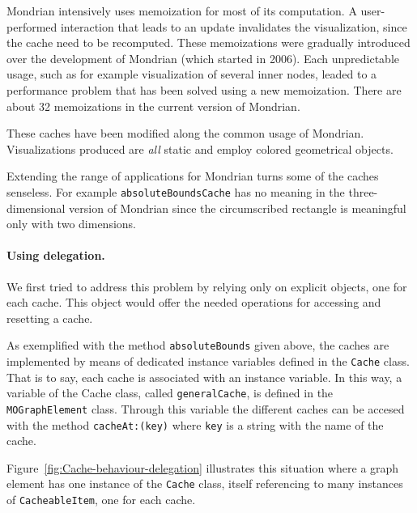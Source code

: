 \documentclass[preprint,10pt]{sigplanconf}
\newcommand{\ct}{\lstinline[backgroundcolor=\color{white},basicstyle=\footnotesize\ttfamily]}
\newcommand{\ab}[1]{\nb{Alexandre}{blue}{#1}}
\newcommand{\sv}[1]{\nb{Santiago}{orange}{#1}}
\newcommand{\figref}[1]{Figure~\ref{fig:#1}\xspace}
\begin{document}
Mondrian intensively uses memoization for most of its computation. A user-performed interaction that leads to an update invalidates the visualization, since the cache need to be recomputed. These memoizations were gradually introduced over the development of Mondrian (which started in 2006). Each unpredictable usage, such as for example visualization of several inner nodes, leaded to a performance problem that has been solved using a new memoization. There are about 32 memoizations in the current version of Mondrian.

These caches have been modified along the common usage of Mondrian. Visualizations produced are \emph{all} static and employ colored geometrical objects.

Extending the range of applications for Mondrian turns some of the caches senseless. For example \ct{absoluteBoundsCache} has no meaning in the three-dimensional version of Mondrian since the circumscribed rectangle is meaningful only with two dimensions.

\paragraph{Using delegation.}
We first tried to address this problem by relying only on explicit objects, one for each cache. This object would offer the needed operations for accessing and resetting a cache.

As exemplified with the method \ct{absoluteBounds} given above, the caches are implemented by means of dedicated instance variables defined in the \ct{Cache} class. That is to say, each cache is associated with an instance variable. In this way, a variable of the Cache class, called \ct{generalCache}, is defined in the \ct{MOGraphElement} class. Through this variable the different caches can be accesed with the method \ct{cacheAt:(key)} where \ct{key} is a string with the name of the cache.

\figref{Cache-behaviour-delegation} illustrates this situation where a graph element has one instance of the \ct{Cache} class, itself referencing to many instances of \ct{CacheableItem}, one for each cache.
\end{document}
